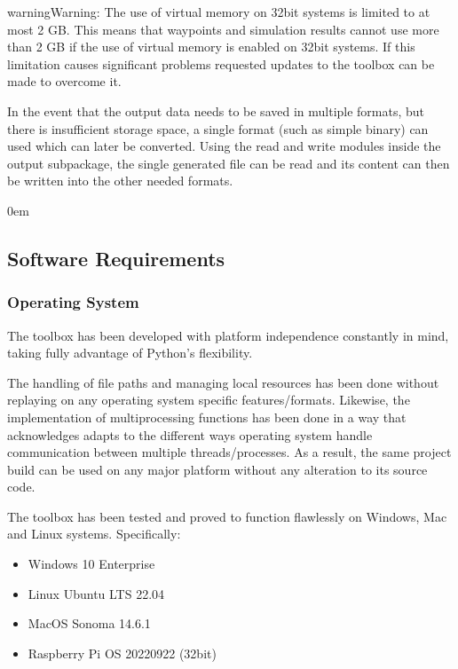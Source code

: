 \documentclass[letterpaper,10pt,english]{sphinxmanual}
\begin{document}
\begin{sphinxadmonition}{warning}{Warning:}
\sphinxAtStartPar
The use of virtual memory on 32\sphinxhyphen{}bit systems is limited to at most 2 GB. This means that waypoints and
simulation results cannot use more than 2 GB if the use of virtual memory is enabled on 32\sphinxhyphen{}bit systems. If this
limitation causes significant problems requested updates to the toolbox can be made to overcome it.
\end{sphinxadmonition}

\sphinxAtStartPar
In the event that the output data needs to be saved in multiple formats, but there is insufficient storage space,
a single format (such as simple binary) can used which can later be converted. Using the read and write modules inside
the output sub\sphinxhyphen{}package, the single generated file can be read and its content can then be written into the other
needed formats.

\begin{DUlineblock}{0em}
\item[] 
\end{DUlineblock}


\subsection{Software Requirements}
\label{\detokenize{usage/requirements:software-requirements}}

\subsubsection{Operating System}
\label{\detokenize{usage/requirements:operating-system}}
\sphinxAtStartPar
The toolbox has been developed with platform independence constantly in mind, taking fully advantage of Python’s
flexibility.

\sphinxAtStartPar
The handling of file paths and managing local resources has been done without replaying on any operating system
specific features/formats. Likewise, the implementation of multi\sphinxhyphen{}processing functions has been done in a way that
acknowledges adapts to the different ways operating system handle communication between multiple threads/processes.
As a result, the same project build can be used on any major platform without any alteration to its source code.

\sphinxAtStartPar
The toolbox has been tested and proved to function flawlessly on Windows, Mac and Linux systems. Specifically:
\begin{itemize}
\item {} 
\sphinxAtStartPar
Windows 10 \sphinxhyphen{} Enterprise

\item {} 
\sphinxAtStartPar
Linux \sphinxhyphen{} Ubuntu LTS 22.04

\item {} 
\sphinxAtStartPar
MacOS \sphinxhyphen{} Sonoma 14.6.1

\item {} 
\sphinxAtStartPar
Raspberry Pi OS \sphinxhyphen{} 2022\sphinxhyphen{}09\sphinxhyphen{}22 (32\sphinxhyphen{}bit)

\end{itemize}
\end{document}
